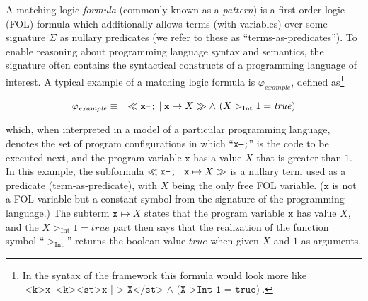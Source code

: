 

A matching logic \emph{formula} (commonly known as a \emph{pattern}) is a
first-order logic (FOL) formula which additionally allows terms (with variables)
over some signature $\Sigma$ as nullary predicates (we refer to these as ``terms-as-predicates'').
To enable reasoning about programming language syntax and semantics,
the signature often contains the syntactical constructs of a programming language of interest.
A typical example of a matching logic formula is $\varphi_{\mathit{example}}$,
defined as\footnote{In the syntax of the \K{} framework this formula would look more like
$\texttt{<k>x--<k><st>x |-> X</st> } \land \texttt{ (X >Int  1 = true)}$.}


\begin{equation}\label{eqn:exampleMLPattern}
    \varphi_{\mathit{example}} \equiv\quad \ll\texttt{x--;}\mid \texttt{x}\mapsto X\gg  \land\ (X >_\text{Int} 1 = \mathit{true})
\end{equation}


which, when interpreted in a model of a particular programming language,
denotes the set of program configurations in which ``\texttt{x--;}'' is the
code to be executed next, and the program variable $\texttt{x}$ has a value $X$
that is greater than $1$.  In this example, the subformula
$\ll\texttt{x--;}\mid \mathtt{x}\mapsto X\gg$ is a nullary term used as a predicate
(term-as-predicate), with $X$ being the only free FOL variable.  ($\texttt{x}$
is not a FOL variable but a constant symbol from the signature of the
programming language.)  The subterm $\texttt{x}\mapsto X$ states that the
program variable $\texttt{x}$ has value $X$, and the
$X >_\text{Int} 1 = \mathit{true}$ part then says that the realization of the
function symbol ``$>_\text{Int}$'' returns the boolean value $\mathit{true}$
when given $X$ and $1$ as arguments.

